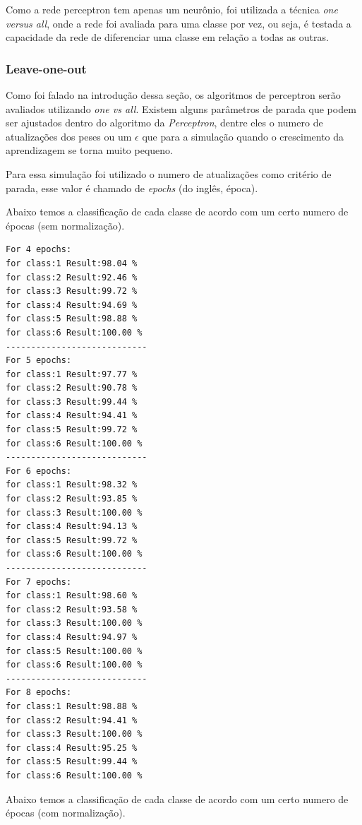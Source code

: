 \documentclass[paper=a4, fontsize=11pt]{scrartcl}
\numberwithin{equation}{section}		%
\numberwithin{figure}{section}			%
\numberwithin{table}{section}				%
\begin{document}
	Como a rede perceptron tem apenas um neurônio, foi utilizada a técnica \textit{one versus all}, onde a rede foi avaliada para uma classe por vez, ou seja, é testada a capacidade da rede de diferenciar uma classe em relação a todas as outras.
	
	\subsubsection{Leave-one-out}
	
    Como foi falado na introdução dessa seção, os algoritmos de perceptron serão avaliados utilizando \textit{one vs all}. Existem alguns parâmetros de parada que podem ser ajustados dentro do algoritmo da \textit{Perceptron}, dentre eles o numero de atualizações dos peses ou um $\epsilon$ que para a simulação quando o crescimento da aprendizagem se torna muito pequeno.
    
    Para essa simulação foi utilizado o numero de atualizações como critério de parada, esse valor é chamado de \textit{epochs} (do inglês, época).
    
    Abaixo temos a classificação de cada classe de acordo com um certo numero de épocas (sem normalização).
    
	\begin{multicols}{2}
    	\begin{verbatim}
For 4 epochs:
for class:1 Result:98.04 %
for class:2 Result:92.46 %
for class:3 Result:99.72 %
for class:4 Result:94.69 %
for class:5 Result:98.88 %
for class:6 Result:100.00 %
----------------------------
For 5 epochs:
for class:1 Result:97.77 %
for class:2 Result:90.78 %
for class:3 Result:99.44 %
for class:4 Result:94.41 %
for class:5 Result:99.72 %
for class:6 Result:100.00 %
----------------------------
For 6 epochs:
for class:1 Result:98.32 %
for class:2 Result:93.85 %
for class:3 Result:100.00 %
for class:4 Result:94.13 %
for class:5 Result:99.72 %
for class:6 Result:100.00 %
----------------------------
For 7 epochs:
for class:1 Result:98.60 %
for class:2 Result:93.58 %
for class:3 Result:100.00 %
for class:4 Result:94.97 %
for class:5 Result:100.00 %
for class:6 Result:100.00 %
----------------------------
For 8 epochs:
for class:1 Result:98.88 %
for class:2 Result:94.41 %
for class:3 Result:100.00 %
for class:4 Result:95.25 %
for class:5 Result:99.44 %
for class:6 Result:100.00 %
    	\end{verbatim}
	\end{multicols}

Abaixo temos a classificação de cada classe de acordo com um certo numero de épocas (com normalização).
    
\end{document}
